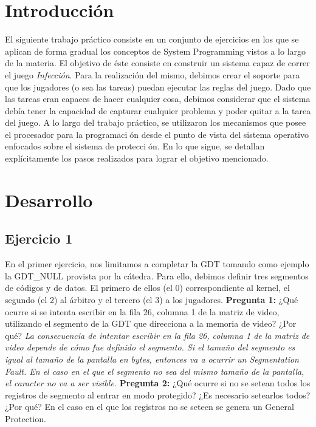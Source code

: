\documentclass[10pt, a4paper]{article}
\begin{document}
\section{Introducci\'on}
El siguiente trabajo práctico consiste en un conjunto de ejercicios en los que se aplican de forma gradual los conceptos de System Programming vistos a lo largo de la materia. El objetivo de éste consiste en construir un sistema capaz de correr el juego \textit{Infección}. Para la realización del mismo, debimos crear el soporte para que los jugadores (o sea las tareas) puedan ejecutar las reglas del juego. Dado que las tareas eran capaces de hacer cualquier cosa, debimos considerar que el sistema debía tener la capacidad de capturar cualquier problema y poder quitar a la tarea del juego.\newline
A lo largo del trabajo práctico, se utilizaron los mecanismos que posee el procesador para la programación desde el punto de vista del sistema operativo enfocados sobre el sistema de protección. En lo que sigue, se detallan explícitamente los pasos realizados para lograr el objetivo mencionado.

\section{Desarrollo}

\subsection{Ejercicio 1}

En el primer ejercicio, nos limitamos a completar la GDT tomando como ejemplo la GDT_NULL provista por la cátedra. Para ello, debimos definir tres segmentos de códigos y de datos. El primero de ellos (el 0) correspondiente al kernel, el segundo (el 2) al árbitro y el tercero (el 3) a los jugadores.\newline
{\textbf{Pregunta 1:}} ¿Qué ocurre si se intenta escribir en la fila 26, columna 1 de la matriz de video, utilizando el segmento de la GDT que direcciona a la memoria de video? ¿Por qué?\newline
\newline
\textit{La consecuencia de intentar escribir en la fila 26, columna 1 de la matriz de video depende de cómo fue definido el segmento. Si el tamaño del segmento es igual al tamaño de la pantalla en bytes, entonces va a ocurrir un Segmentation Fault. En el caso en el que el segmento no sea del mismo tamaño de la pantalla, el caracter no va a ser visible.}\newline
\newline
{\textbf{Pregunta 2:}} ¿Qué ocurre si no se setean todos los registros de segmento al entrar en modo protegido? ¿Es necesario setearlos todos? ¿Por qué?\newline
En el caso en el que los registros no se seteen se genera un General Protection.
\end{document}
